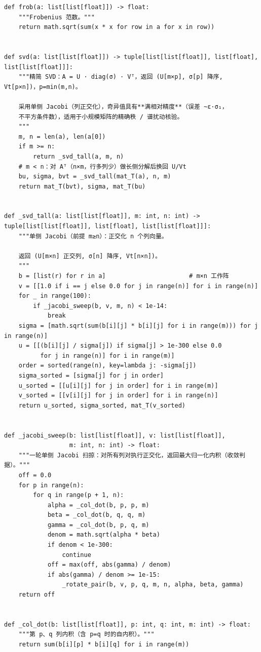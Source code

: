 \documentclass[UTF8,11pt,a4paper]{ctexart}
\theoremstyle{plain}
\theoremstyle{definition}
\theoremstyle{remark}
\begin{document}
\begin{Verbatim}[fontsize=\scriptsize,frame=single,breaklines=true,breakanywhere=true,breaksymbolleft={}]
def frob(a: list[list[float]]) -> float:
    """Frobenius 范数。"""
    return math.sqrt(sum(x * x for row in a for x in row))


def svd(a: list[list[float]]) -> tuple[list[list[float]], list[float], list[list[float]]]:
    """精简 SVD：A = U · diag(σ) · Vᵀ，返回 (U[m×p], σ[p] 降序, Vt[p×n])，p=min(m,n)。

    采用单侧 Jacobi（列正交化），奇异值具有**满相对精度**（误差 ~ε·σ₁，
    不平方条件数），适用于小规模矩阵的精确秩 / 谱扰动核验。
    """
    m, n = len(a), len(a[0])
    if m >= n:
        return _svd_tall(a, m, n)
    # m < n：对 Aᵀ（n×m，行多列少）做长侧分解后换回 U/Vt
    bu, sigma, bvt = _svd_tall(mat_T(a), n, m)
    return mat_T(bvt), sigma, mat_T(bu)


def _svd_tall(a: list[list[float]], m: int, n: int) -> tuple[list[list[float]], list[float], list[list[float]]]:
    """单侧 Jacobi（前提 m≥n）：正交化 n 个列向量。

    返回 (U[m×n] 正交列, σ[n] 降序, Vt[n×n])。
    """
    b = [list(r) for r in a]                       # m×n 工作阵
    v = [[1.0 if i == j else 0.0 for j in range(n)] for i in range(n)]
    for _ in range(100):
        if _jacobi_sweep(b, v, m, n) < 1e-14:
            break
    sigma = [math.sqrt(sum(b[i][j] * b[i][j] for i in range(m))) for j in range(n)]
    u = [[(b[i][j] / sigma[j]) if sigma[j] > 1e-300 else 0.0
          for j in range(n)] for i in range(m)]
    order = sorted(range(n), key=lambda j: -sigma[j])
    sigma_sorted = [sigma[j] for j in order]
    u_sorted = [[u[i][j] for j in order] for i in range(m)]
    v_sorted = [[v[i][j] for j in order] for i in range(n)]
    return u_sorted, sigma_sorted, mat_T(v_sorted)


def _jacobi_sweep(b: list[list[float]], v: list[list[float]],
                  m: int, n: int) -> float:
    """一轮单侧 Jacobi 扫掠：对所有列对执行正交化，返回最大归一化内积（收敛判据）。"""
    off = 0.0
    for p in range(n):
        for q in range(p + 1, n):
            alpha = _col_dot(b, p, p, m)
            beta = _col_dot(b, q, q, m)
            gamma = _col_dot(b, p, q, m)
            denom = math.sqrt(alpha * beta)
            if denom < 1e-300:
                continue
            off = max(off, abs(gamma) / denom)
            if abs(gamma) / denom >= 1e-15:
                _rotate_pair(b, v, p, q, m, n, alpha, beta, gamma)
    return off


def _col_dot(b: list[list[float]], p: int, q: int, m: int) -> float:
    """第 p、q 列内积（含 p=q 时的自内积）。"""
    return sum(b[i][p] * b[i][q] for i in range(m))



\end{Verbatim}
\end{document}
